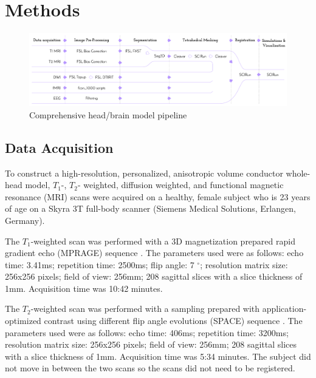 
\section{Methods}
\label{sec:Methods}

\begin{figure}[H]
    \centering
    \includegraphics[width=\textwidth]{Figures/pipeline}
    \caption{Comprehensive head/brain model pipeline}
    \label{fig:pipeline}
\end{figure}

\subsection{Data Acquisition}
\label{sec:Data}


To construct a high-resolution, personalized, anisotropic volume conductor whole-head model, $T_1$-, $T_2$- weighted, diffusion weighted, and functional magnetic resonance (MRI) scans were acquired on a healthy, female subject who is 23 years of age on a Skyra 3T full-body scanner (Siemens Medical Solutions, Erlangen, Germany). 

The $T_1$-weighted scan was performed with a 3D magnetization prepared rapid gradient echo (MPRAGE) sequence \cite{ref:mprage}. The parameters used were as follows: echo time: 3.41ms; repetition time: 2500ms; flip angle: 7 $^{\circ}$; resolution matrix size: 256x256 pixels; field of view: 256mm; 208 sagittal slices with a slice thickness of 1mm. Acquisition time was 10:42 minutes. 

The $T_2$-weighted scan was performed with a sampling prepared with application-optimized contrast using different flip angle evolutions (SPACE) sequence \cite{ref:space}. The parameters used were as follows: echo time: 406ms; repetition time: 3200ms; resolution matrix size: 256x256 pixels; field of view: 256mm; 208 sagittal slices with a slice thickness of 1mm. Acquisition time was 5:34 minutes. The subject did not move in between the two scans so the scans did not need to be registered. 

